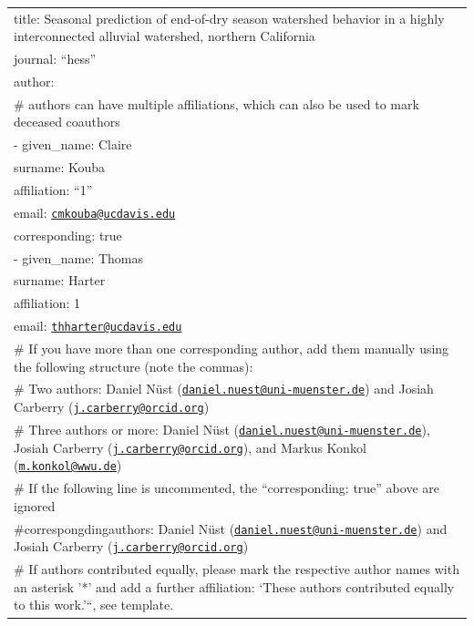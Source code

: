 \documentclass[
]{article}
\author{}
\date{\vspace{-2.5em}}
\begin{document}
\nolinenumbers

\begin{longtable}[]{@{}l@{}}
\toprule()
\endhead
title: Seasonal prediction of end-of-dry season watershed behavior in a
highly interconnected alluvial watershed, northern California \\
journal: ``hess'' \\
author: \\
\# authors can have multiple affiliations, which can also be used to
mark deceased coauthors \\
- given\_name: Claire \\
surname: Kouba \\
affiliation: ``1'' \\
email:
\href{mailto:cmkouba@ucdavis.edu}{\nolinkurl{cmkouba@ucdavis.edu}} \\
corresponding: true \\
- given\_name: Thomas \\
surname: Harter \\
affiliation: 1 \\
email:
\href{mailto:thharter@ucdavis.edu}{\nolinkurl{thharter@ucdavis.edu}} \\
\# If you have more than one corresponding author, add them manually
using the following structure (note the commas): \\
\# Two authors: Daniel Nüst
(\href{mailto:daniel.nuest@uni-muenster.de}{\nolinkurl{daniel.nuest@uni-muenster.de}})
and Josiah Carberry
(\href{mailto:j.carberry@orcid.org}{\nolinkurl{j.carberry@orcid.org}}) \\
\# Three authors or more: Daniel Nüst
(\href{mailto:daniel.nuest@uni-muenster.de}{\nolinkurl{daniel.nuest@uni-muenster.de}}),
Josiah Carberry
(\href{mailto:j.carberry@orcid.org}{\nolinkurl{j.carberry@orcid.org}}),
and Markus Konkol
(\href{mailto:m.konkol@wwu.de}{\nolinkurl{m.konkol@wwu.de}}) \\
\# If the following line is uncommented, the ``corresponding: true''
above are ignored \\
\#correspongdingauthors: Daniel Nüst
(\href{mailto:daniel.nuest@uni-muenster.de}{\nolinkurl{daniel.nuest@uni-muenster.de}})
and Josiah Carberry
(\href{mailto:j.carberry@orcid.org}{\nolinkurl{j.carberry@orcid.org}}) \\
\# If authors contributed equally, please mark the respective author
names with an asterisk '*' and add a further affiliation: `These authors
contributed equally to this work.'``, see template. \\

\end{longtable}
\end{document}
